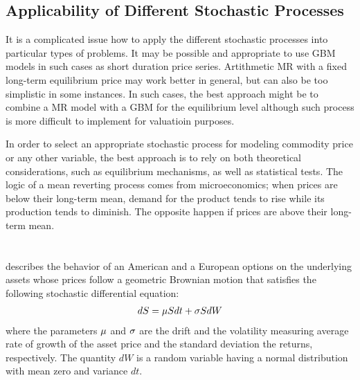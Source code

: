 \documentclass[11pt,letter]{article}
\theoremstyle{definition}
\theoremstyle{remark}
\numberwithin{equation}{section}
\begin{document}
\subsection{Applicability of Different Stochastic Processes}
It is a complicated issue how to apply the different stochastic processes into particular types of problems. It may be possible and appropriate to use GBM models in such cases as short duration price series. Artithmetic MR with a fixed long-term equilibrium price may work better in general, but can also be too simplistic in some instances. In such cases, the best approach might be to combine a MR model with a GBM for the equilibrium level although such process is more difficult to implement for valuatioin purposes.

In order to select an appropriate stochastic process for modeling commodity price or any other variable, the best approach is to rely on both theoretical considerations, such as equilibrium mechanisms, as well as statistical tests. The logic of a mean reverting process comes from microeconomics; when prices are below their long-term mean, demand for the product tends to rise while its production tends to diminish. The opposite happen if prices are above their long-term mean. 


\section{\cite{black1973pricing}}

\cite{black1973pricing} describes the behavior of an American and a European options on the underlying assets whose prices follow a geometric Brownian motion that satisfies the following stochastic differential equation:
\begin{align}
    dS=\mu Sdt+\sigma SdW
\end{align}
where the parameters $\mu$ and $\sigma$ are the drift and the volatility measuring average rate of growth of the asset price and the standard deviation the returns, respectively. The quantity $dW$ is a random variable having a normal distribution with mean zero and variance $dt$.
\end{document}
